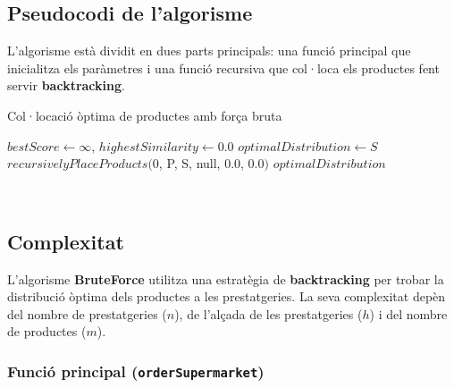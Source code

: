 \documentclass[a4paper,12pt]{report}
\begin{document}
\begin{itemize}
\subsection{Pseudocodi de l'algorisme}
L'algorisme està dividit en dues parts principals: una funció principal que inicialitza els paràmetres i una funció recursiva que col·loca els productes fent servir \textbf{backtracking}.
\newline
\begin{algorithm}[H]
	\SetAlgoVlined
		\caption{Col·locació òptima de productes amb força bruta}
		$bestScore \gets \infty$, $highestSimilarity \gets 0.0$\;
		$optimalDistribution \gets S$\;
		$recursivelyPlaceProducts($0, P, S, null, 0.0, 0.0$)$\;
	\Return $optimalDistribution$\;

	\

\end{algorithm}




\subsection{Complexitat}
L'algorisme \textbf{BruteForce} utilitza una estratègia de \textbf{backtracking} per trobar la distribució òptima dels productes a les prestatgeries. La seva complexitat depèn del nombre de prestatgeries (\(n\)), de l'alçada de les prestatgeries (\(h\)) i del nombre de productes (\(m\)).

\subsubsection{Funció principal (\texttt{orderSupermarket})}


\end{itemize}
\end{document}
